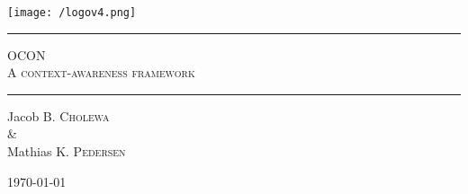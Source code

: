 \begin{titlepage}
\begin{center}

\vspace{2cm}

\centering\texttt{[image: /logov4.png]}

\vspace{1cm}

\rule{\linewidth}{0.6mm}

\textsc{\LARGE OCON}\\
\textsc{\large A context-awareness framework}
\vspace{0.2cm}
\rule{\linewidth}{0.4mm}

Jacob B. \textsc{Cholewa}
\\ \& \\
Mathias K. \textsc{Pedersen}

\vfill

\large \today
\end{center}


\end{titlepage}